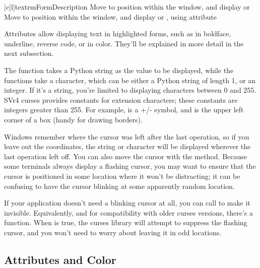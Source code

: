 \documentclass{howto}
\begin{document}
\begin{tableii}{|c|l|}{textrm}{Form}{Description}
{Move to position  within the window, and display 
or }
{Move to position  within the window, and display 
or , using attribute }
\end{tableii}

Attributes allow displaying text in highlighted forms, such as in
boldface, underline, reverse code, or in color.  They'll be explained
in more detail in the next subsection.

The  function takes a Python string as the value to
be displayed, while the  functions take a character,
which can be either a Python string of length 1, or an integer.  If
it's a string, you're limited to displaying characters between 0 and
255.  SVr4 curses provides constants for extension characters; these
constants are integers greater than 255.  For example,
 is a +/- symbol, and  is
the upper left corner of a box (handy for drawing borders).

Windows remember where the cursor was left after the last operation,
so if you leave out the  coordinates, the string or character
will be displayed wherever the last operation left off.  You can also
move the cursor with the  method.  Because
some terminals always display a flashing cursor, you may want to
ensure that the cursor is positioned in some location where it won't
be distracting; it can be confusing to have the cursor blinking at
some apparently random location.  

If your application doesn't need a blinking cursor at all, you can
call  to make it invisible.  Equivalently, and
for compatibility with older curses versions, there's a
 function.  When  is true, the
curses library will attempt to suppress the flashing cursor, and you
won't need to worry about leaving it in odd locations.

\subsection{Attributes and Color}
\end{document}
